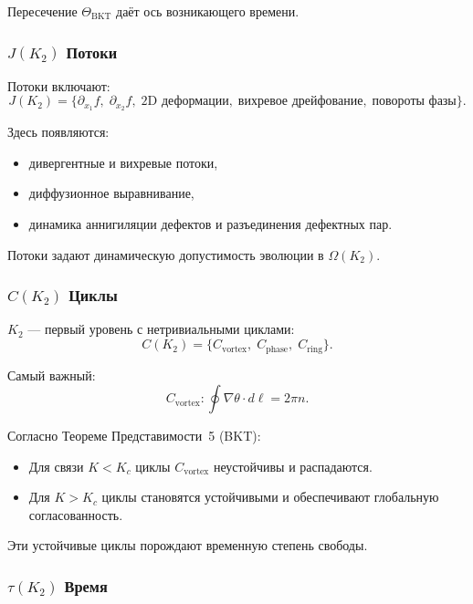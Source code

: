 Пересечение $\Theta_{\mathrm{BKT}}$ даёт ось возникающего времени.

\subsubsection{\texorpdfstring{$J(K_2)$}{J(K_2)} Потоки}

Потоки включают:
\[
J(K_2) = \{\partial_{x_1} f,\; \partial_{x_2} f,\;
\text{2D деформации},\; \text{вихревое дрейфование},\; \text{повороты фазы}\}.
\]

Здесь появляются:
\begin{itemize}
    \item дивергентные и вихревые потоки,
    \item диффузионное выравнивание,
    \item динамика аннигиляции дефектов и разъединения дефектных пар.
\end{itemize}

Потоки задают динамическую допустимость эволюции в $\Omega(K_2)$.

\subsubsection{\texorpdfstring{$C(K_2)$}{C(K_2)} Циклы}

$K_2$ — первый уровень с нетривиальными циклами:
\[
C(K_2) = \{C_{\mathrm{vortex}},\; C_{\mathrm{phase}},\; C_{\mathrm{ring}}\}.
\]

Самый важный:
\[
C_{\mathrm{vortex}}: \oint \nabla \theta \cdot d\ell = 2\pi n.
\]

Согласно Теореме Представимости~5 (BKT):
\begin{itemize}
    \item Для связи $K < K_c$ циклы $C_{\mathrm{vortex}}$ неустойчивы и
          распадаются.
    \item Для $K > K_c$ циклы становятся устойчивыми и обеспечивают
          глобальную согласованность.
\end{itemize}

Эти устойчивые циклы порождают временную степень свободы.

\subsubsection{\texorpdfstring{$\tau(K_2)$}{\tau(K_2)} Время}

